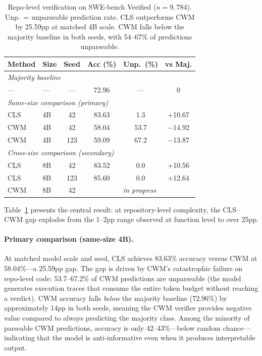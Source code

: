 \begin{table}[t]
\centering
\small
\begin{tabular}{llcccc}
\toprule
\textbf{Method} & \textbf{Size} & \textbf{Seed} & \textbf{Acc (\%)} & \textbf{Unp.\ (\%)} & \textbf{vs Maj.} \\
\midrule
\multicolumn{6}{l}{\emph{Majority baseline}} \\
--- & --- & --- & 72.96 & --- & 0 \\
\midrule
\multicolumn{6}{l}{\emph{Same-size comparison (primary)}} \\
CLS & 4B & 42 & 83.63 & 1.3 & +10.67 \\
CWM & 4B & 42 & 58.04 & 53.7 & $-$14.92 \\
CWM & 4B & 123 & 59.09 & 67.2 & $-$13.87 \\
\midrule
\multicolumn{6}{l}{\emph{Cross-size comparison (secondary)}} \\
CLS & 8B & 42 & 83.52 & 0.0 & +10.56 \\
CLS & 8B & 123 & 85.60 & 0.0 & +12.64 \\
CWM & 8B & 42 & \multicolumn{3}{c}{\emph{in progress}} \\
\bottomrule
\end{tabular}
\caption{Repo-level verification on SWE-bench Verified ($n$$=$$9{,}784$). Unp.\ = unparseable prediction rate. CLS outperforms CWM by 25.59pp at matched 4B scale. CWM falls below the majority baseline in both seeds, with 54--67\% of predictions unparseable.}
\label{tab:repo_results}
\end{table}

Table~\ref{tab:repo_results} presents the central result: at repository-level complexity, the CLS--CWM gap explodes from the 1--2pp range observed at function level to over 25pp.

\paragraph{Primary comparison (same-size 4B).}
At matched model scale and seed, CLS achieves 83.63\% accuracy versus CWM at 58.04\%---a 25.59pp gap.
The gap is driven by CWM's catastrophic failure on repo-level code: 53.7--67.2\% of CWM predictions are unparseable (the model generates execution traces that consume the entire token budget without reaching a verdict).
CWM accuracy falls \emph{below} the majority baseline (72.96\%) by approximately 14pp in both seeds, meaning the CWM verifier provides negative value compared to always predicting the majority class.
Among the minority of parseable CWM predictions, accuracy is only 42--43\%---below random chance---indicating that the model is anti-informative even when it produces interpretable output.

